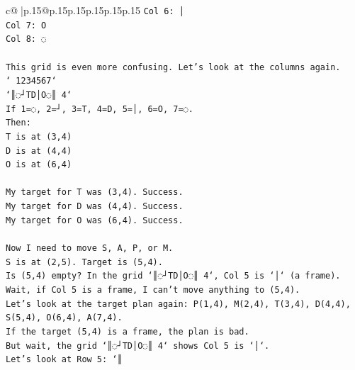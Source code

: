 \documentclass{article}
\begin{document}
{\begin{supertabular}{c@{$\;$}|p{.15\linewidth}@{}p{.15\linewidth}p{.15\linewidth}p{.15\linewidth}p{.15\linewidth}p{.15\linewidth}}
{{{\texttt{Col 6: │} \\
\texttt{Col 7: O} \\
\texttt{Col 8: ◌} \\
\\ 
\texttt{This grid is even more confusing. Let's look at the columns again.} \\
\texttt{` 1234567`} \\
\texttt{`║◌┘TD│O◌║ 4`} \\
\texttt{If 1=◌, 2=┘, 3=T, 4=D, 5=│, 6=O, 7=◌.} \\
\texttt{Then:} \\
\texttt{T is at (3,4)} \\
\texttt{D is at (4,4)} \\
\texttt{O is at (6,4)} \\
\\ 
\texttt{My target for T was (3,4). Success.} \\
\texttt{My target for D was (4,4). Success.} \\
\texttt{My target for O was (6,4). Success.} \\
\\ 
\texttt{Now I need to move S, A, P, or M.} \\
\texttt{S is at (2,5). Target is (5,4).} \\
\texttt{Is (5,4) empty? In the grid `║◌┘TD│O◌║ 4`, Col 5 is `│` (a frame).} \\
\texttt{Wait, if Col 5 is a frame, I can't move anything to (5,4).} \\
\texttt{Let's look at the target plan again: P(1,4), M(2,4), T(3,4), D(4,4), S(5,4), O(6,4), A(7,4).} \\
\texttt{If the target (5,4) is a frame, the plan is bad.} \\
\texttt{But wait, the grid `║◌┘TD│O◌║ 4` shows Col 5 is `│`.} \\
\texttt{Let's look at Row 5: `║} \\
            }
        }
    }
     \\ \\


\end{supertabular}}
\end{document}
